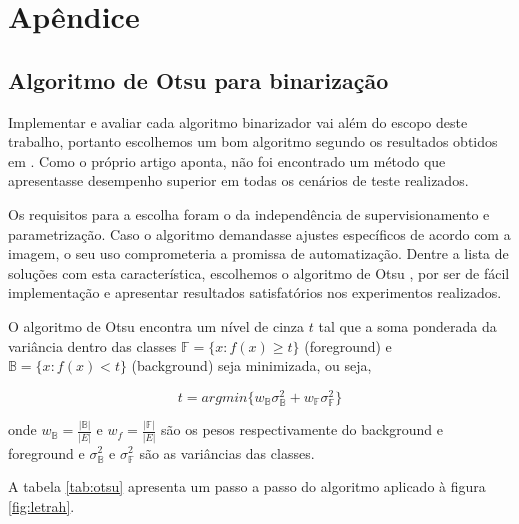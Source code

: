 \documentclass[a4paper,11pt]{article}
\begin{document}
\section{Apêndice}

  \subsection{Algoritmo de Otsu para binarização}
  \label{sec:otsu}

    Implementar e avaliar cada algoritmo binarizador vai além do escopo deste trabalho, portanto escolhemos um bom algoritmo segundo os resultados obtidos em \cite{citeulike:890354}. Como o próprio artigo aponta, não foi encontrado um método que apresentasse desempenho superior em todas os cenários de teste realizados.

    Os requisitos para a escolha foram o da independência de supervisionamento e parametrização. Caso o algoritmo demandasse ajustes específicos de acordo com a imagem, o seu uso comprometeria a promissa de automatização. Dentre a lista de soluções com esta característica, escolhemos o algoritmo de Otsu \cite{1979:ots}, por ser de fácil implementação e apresentar resultados satisfatórios nos experimentos realizados.

    O algoritmo de Otsu encontra um nível de cinza $t$ tal que a soma ponderada da variância dentro das classes $\mathbb{F} = \{ x \colon f(x) \geq t \}$ (foreground) e $\mathbb{B} = \{ x \colon f(x) < t \}$ (background) seja minimizada, ou seja,

    \begin{equation}
      t = argmin \{ w_\mathbb{B} \sigma^{2}_{\mathbb{B}} + w_\mathbb{F} \sigma^{2}_{\mathbb{F}} \}
    \end{equation}

    onde $w_\mathbb{B} = \frac{|\mathbb{B}|}{|E|}$ e $w_f = \frac{|\mathbb{F}|}{|E|}$ são os pesos respectivamente do background e foreground e $\sigma^{2}_{\mathbb{B}}$ e $\sigma^{2}_{\mathbb{F}}$ são as variâncias das classes.

    A tabela \ref{tab:otsu} apresenta um passo a passo do algoritmo aplicado à figura \ref{fig:letrah}.
\end{document}
